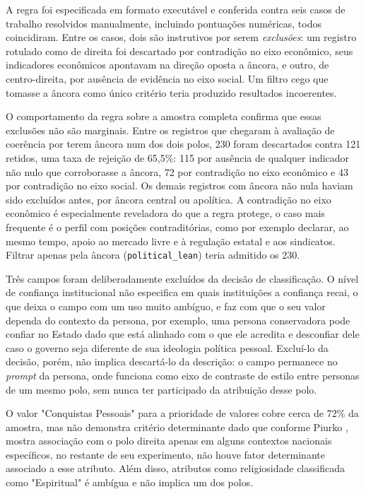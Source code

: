 \documentclass[conference]{IEEEtran} \IEEEoverridecommandlockouts %
\begin{document}
A regra foi especificada em formato executável e conferida contra seis casos de
trabalho resolvidos manualmente, incluindo pontuações numéricas, todos
coincidiram. Entre os casos, dois são instrutivos por serem \textit{exclusões}:
um registro rotulado como de direita foi descartado por contradição no eixo
econômico, seus indicadores econômicos apontavam na direção oposta a âncora,
e outro, de centro-direita, por ausência de evidência no eixo social. Um filtro cego que
tomasse a âncora como único critério teria produzido resultados incoerentes.

O comportamento da regra sobre a amostra completa confirma que essas exclusões
não são marginais. Entre os registros que chegaram à avaliação de coerência
por terem âncora num dos dois polos, 230 foram descartados contra 121
retidos, uma taxa de rejeição de 65,5\%: 115 por ausência de qualquer
indicador não nulo que corroborasse a âncora, 72 por contradição no eixo
econômico e 43 por contradição no eixo social. Os demais registros com âncora
não nula haviam sido excluídos antes, por âncora central ou apolítica. A
contradição no eixo econômico é especialmente reveladora do que a regra protege, o caso mais frequente é o perfil com posições contraditórias, como por exemplo declarar, ao mesmo
tempo, apoio ao mercado livre e à regulação estatal e aos sindicatos. Filtrar
apenas pela âncora (\texttt{political\_lean}) teria admitido os 230.

Três campos foram deliberadamente excluídos da decisão de classificação. O
nível de confiança institucional não especifica em quais instituições
a confiança recai, o que deixa o campo com um uso muito ambíguo, e faz com que o seu valor dependa do contexto da persona, por exemplo, uma persona conservadora pode confiar no Estado dado que está alinhado com o que ele acredita e desconfiar dele caso o governo seja diferente de sua ideologia política pessoal. Excluí-lo da decisão, porém, não implica descartá-lo da descrição: o campo permanece no \textit{prompt} da persona, onde
funciona como eixo de contraste de estilo entre personas de um mesmo polo,
sem nunca ter participado da atribuição desse polo.

O valor "Conquistas Pessoais" para a prioridade de valores cobre cerca de 72\% da amostra, mas não demonstra critério determinante dado que conforme Piurko \cite{piurko2011basic}, mostra associação com o polo direita apenas em alguns contextos nacionais específicos, no restante de seu experimento, não houve fator determinante associado a esse atributo. Além disso, atributos como religiosidade classificada como "Espiritual" é ambígua e não implica um dos polos. 
\end{document}
